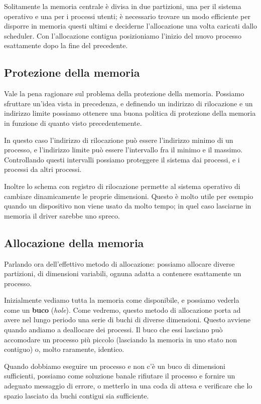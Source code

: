     Solitamente la memoria centrale è divisa in due partizioni, una per il sistema operativo e una per i processi utenti; è necessario trovare un modo efficiente per disporre in memoria questi ultimi e deciderne l'allocazione una volta caricati dallo scheduler. Con l'allocazione contigua posizioniamo l'inizio del nuovo processo esattamente dopo la fine del precedente.
    
    \subsection{Protezione della memoria}
        Vale la pena ragionare sul problema della protezione della memoria. Possiamo sfruttare un'idea vista in precedenza, e definendo un indirizzo di rilocazione e un indirizzo limite possiamo ottenere una buona politica di protezione della memoria in funzione di quanto visto precedentemente.
        
        In questo caso l'indirizzo di rilocazione può essere l'indirizzo minimo di un processo, e l'indirizzo limite può essere l'intervallo fra il minimo e il massimo. Controllando questi intervalli possiamo proteggere il sistema dai processi, e i processi da altri processi.
        
        Inoltre lo schema con registro di rilocazione permette al sistema operativo di cambiare dinamicamente le proprie dimensioni. Questo è molto utile per esempio quando un dispositivo non viene usato da molto tempo; in quel caso lasciarne in memoria il driver sarebbe uno spreco.
        
    \subsection{Allocazione della memoria}
        Parlando ora dell'effettivo metodo di allocazione: possiamo allocare diverse partizioni, di dimensioni variabili, ognuna adatta a contenere esattamente un processo.
        
        Inizialmente vediamo tutta la memoria come disponibile, e possiamo vederla come un \textbf{buco} (\textit{hole}). Come vedremo, questo metodo di allocazione porta ad avere nel lungo periodo una serie di buchi di diverse dimensioni. Questo avviene quando andiamo a deallocare dei processi. Il buco che essi lasciano può accomodare un processo più piccolo (lasciando la memoria in uno stato non contiguo) o, molto raramente, identico.
        
        Quando dobbiamo eseguire un processo e non c'è un buco di dimensioni sufficienti, possiamo come soluzione banale rifiutare il processo e fornire un adeguato messaggio di errore, o metterlo in una coda di attesa e verificare che lo spazio lasciato da buchi contigui sia sufficiente.
        
